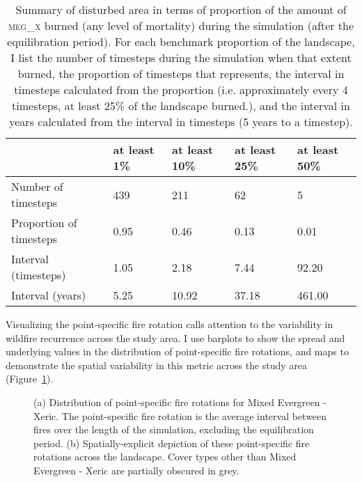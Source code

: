 \begin{table}[!htbp]
\small
\centering
\caption{Summary of disturbed area in terms of proportion of the amount of \textsc{meg\_x} burned (any level of mortality) during the simulation (after the equilibration period). For each benchmark proportion of the landscape, I list the number of timesteps during the simulation when that extent burned, the proportion of timesteps that represents, the interval in timesteps calculated from the proportion (i.e. approximately every 4 timesteps, at least 25\% of the landscape burned.), and the interval in years calculated from the interval in timesteps (5 years to a timestep).}
\label{tab:darea_atleast_megx}
\begin{tabular}{@{}lllll@{}}
                        & at least 1\% & at least 10\% & at least 25\% & at least 50\% \\ \midrule
Number of timesteps     & 439          & 211           & 62            & 5             \\
Proportion of timesteps & 0.95         & 0.46          & 0.13          & 0.01          \\
Interval (timesteps)    & 1.05         & 2.18          & 7.44          & 92.20         \\
Interval (years)        & 5.25         & 10.92         & 37.18         & 461.00       \\ \bottomrule
\end{tabular}
\end{table}

Visualizing the point-specific fire rotation calls attention to the variability in wildfire recurrence across the study area. I use barplots to show the spread and underlying values in the distribution of point-specific fire rotations, and maps to demonstrate the spatial variability in this metric across the study area (Figure~\ref{fig:preturn_megx}).

\begin{figure}[!htbp]
  \centering
  \caption{(a) Distribution of point-specific fire rotations for Mixed Evergreen - Xeric. The point-specific fire rotation is the average interval between fires over the length of the simulation, excluding the equilibration period. (b) Spatially-explicit depiction of these point-specific fire rotations across the landscape. Cover types other than Mixed Evergreen - Xeric are partially obscured in grey.}
\label{fig:preturn_megx}
\end{figure}

